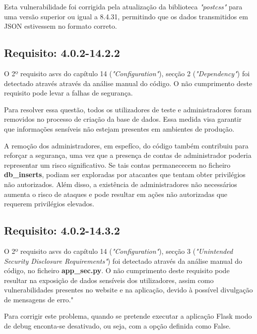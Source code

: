 Esta vulnerabilidade foi corrigida pela atualização da biblioteca \textit{"postcss"} para uma versão superior ou igual a 8.4.31, permitindo que os dados transmitidos em JSON estivessem no formato correto.


\subsection*{Requisito: 4.0.2-14.2.2}

O 2º requisito \ac{asvs} do capítulo 14 (\textit{"Configuration"}), secção 2  (\textit{"Dependency"}) foi detectado através através da análise manual do código.
O não cumprimento deste requisito pode levar a falhas de segurança.

Para resolver essa questão, todos os utilizadores de teste e administradores foram removidos no processo de criação da base de dados. Essa medida visa garantir que informações sensíveis não estejam presentes em ambientes de produção.

A remoção dos administradores, em espefíco, do código também contribuiu para reforçar a segurança, uma vez que a presença de contas de administrador poderia representar um risco significativo. Se tais contas permanececem no ficheiro \textbf{ db\_inserts}, podiam ser exploradas por atacantes que tentam obter privilégios não autorizados. Além disso, a existência de administradores não necessários aumenta o risco de ataques e pode resultar em ações não autorizadas que requerem privilégios elevados.


\subsection*{Requisito: 4.0.2-14.3.2}

O 2º requisito \ac{asvs} do capítulo 14 (\textit{"Configuration"}), secção 3  (\textit{"Unintended Security Disclosure Requirements"}) foi detectado através da análise manual do código, no ficheiro \textbf{app\_sec.py}.
O não cumprimento deste requisito pode resultar na exposição de dados sensíveis dos utilizadores, assim como vulnerabilidades presentes no website e na aplicação, devido à possível divulgação de mensagens de erro."


Para corrigir este problema, quando se pretende executar a aplicação Flask modo de debug enconta-se desativado, ou seja, com a opção definida como False.

